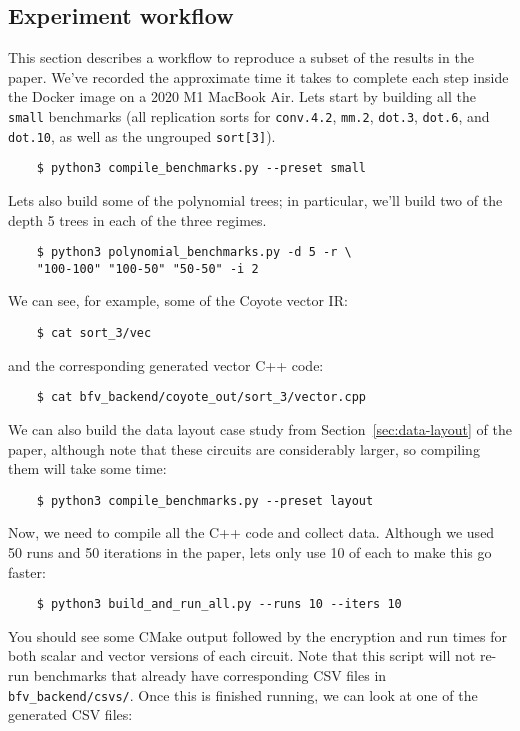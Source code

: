 \subsection{Experiment workflow}
This section describes a workflow to reproduce a subset of the results in the paper.
We've recorded the approximate time it takes to complete each step inside the Docker image on a 2020 M1 MacBook Air.
Lets start by building all the {\tt small} benchmarks (all replication sorts for {\tt conv.4.2}, {\tt mm.2}, {\tt dot.3}, {\tt dot.6}, and {\tt dot.10}, as well as the ungrouped {\tt sort[3]}). 
\begin{verbatim}
    $ python3 compile_benchmarks.py --preset small    
\end{verbatim}
Lets also build some of the polynomial trees; in particular, we'll build two of the depth 5 trees in each of the three regimes.
\begin{verbatim}
    $ python3 polynomial_benchmarks.py -d 5 -r \
    "100-100" "100-50" "50-50" -i 2    
\end{verbatim}
We can see, for example, some of the Coyote vector IR:
\begin{verbatim}
    $ cat sort_3/vec    
\end{verbatim}
and the corresponding generated vector C++ code:
\begin{verbatim}
    $ cat bfv_backend/coyote_out/sort_3/vector.cpp    
\end{verbatim}
We can also build the data layout case study from Section~\ref{sec:data-layout} of the paper, although note that these circuits are considerably larger, so compiling them will take some time:
\begin{verbatim}
    $ python3 compile_benchmarks.py --preset layout    
\end{verbatim}
Now, we need to compile all the C++ code and collect data. Although we used 50 runs and 50 iterations in the paper, lets only use 10 of each to make this go faster:
\begin{verbatim}
    $ python3 build_and_run_all.py --runs 10 --iters 10    
\end{verbatim}
You should see some CMake output followed by the encryption and run times for both scalar and vector versions of each circuit. Note that this script will not re-run benchmarks that already have corresponding CSV files in {\tt bfv\_backend/csvs/}.
Once this is finished running, we can look at one of the generated CSV files:
